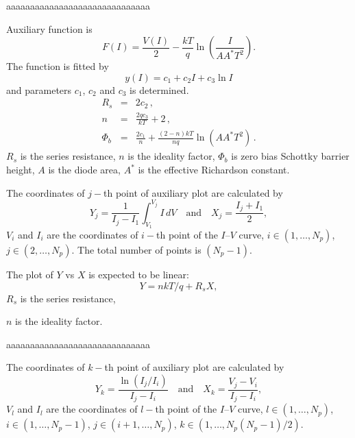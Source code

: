 \documentclass[14pt]{article}
\numberwithin{equation}{part}
\begin{document}
\vspace{5mm}
aaaaaaaaaaaaaaaaaaaaaaaaaaaaaa
\vspace{5mm}

Auxiliary  function is
\begin{equation*}
F(I)=\frac{V(I)}{2}-\frac{kT}{q}\ln\left(\frac{I}{AA^*T^2}\right).
\end{equation*}
The function is fitted by
\begin{equation*}
y(I)=c_1+c_2I+c_3\ln I
\end{equation*}
and parameters $c_1$, $c_2$ and $c_3$ is determined.
\begin{eqnarray*}
R_s&=&2c_2\,,
\\
n&=&\frac{2qc_3}{kT}+2\,,
\\
\Phi_b&=&\frac{2c_1}{n}+\frac{(2-n)kT}{nq}\ln\left(AA^*T^2\right)\,.
\end{eqnarray*}
$R_s$ is the series resistance,
$n$ is the ideality factor,
$\Phi_b$ is zero bias Schottky barrier height,
$A$ is the diode area,
$A^*$ is the effective Richardson constant.

\pagebreak

The coordinates of $j-$th point of auxiliary plot are calculated by
\begin{equation*}
Y_j=\frac{1}{I_j-I_1}\int_{V_1}^{V_j}I\,dV \quad\text{and}\quad X_j=\frac{I_j+I_1}{2},
\end{equation*}
$V_i$ and $I_i$ are the coordinates of $i-$th point of the $I$--$V$ curve,
$i\in(1,\ldots, N_p)$,
$j\in(2,\ldots, N_p)$.
The total number of points is  $(N_p-1)$.

The plot of $Y$ vs $X$ is expected to be linear:
\begin{equation*}
Y=nkT/q+R_sX,
\end{equation*}
$R_s$ is the series resistance,

\noindent
$n$ is the ideality factor.


\vspace{5mm}
aaaaaaaaaaaaaaaaaaaaaaaaaaaaaa
\vspace{5mm}

The coordinates of $k-$th point of auxiliary plot are calculated by
\begin{equation*}
Y_k=\frac{\ln(I_j/I_i)}{I_j-I_i} \quad\text{and}\quad X_k=\frac{V_j-V_i}{I_j-I_i},
\end{equation*}
$V_l$ and $I_l$ are the coordinates of $l-$th point of the $I$--$V$ curve,
$l\in(1,\ldots, N_p)$,
$i\in(1,\ldots, N_p-1)$,
$j\in(i+1,\ldots, N_p)$,
$k\in(1,\ldots, N_p(N_p-1)/2)$.
\end{document}
